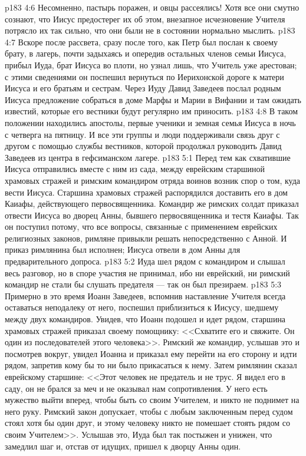 \vs p183 4:6 Несомненно, пастырь поражен, и овцы рассеялись! Хотя все они смутно сознают, что Иисус предостерег их об этом, внезапное исчезновение Учителя потрясло их так сильно, что они были не в состоянии нормально мыслить.
\vs p183 4:7 Вскоре после рассвета, сразу после того, как Петр был послан к своему брату, в лагерь, почти задыхаясь и опередив остальных членов семьи Иисуса, прибыл Иуда, брат Иисуса во плоти, но узнал лишь, что Учитель уже арестован; с этими сведениями он поспешил вернуться по Иерихонской дороге к матери Иисуса и его братьям и сестрам. Через Иуду Давид Заведеев послал родным Иисуса предложение собраться в доме Марфы и Марии в Вифании и там ожидать известий, которые его вестники будут регулярно им приносить.
\vs p183 4:8 В таком положении находились апостолы, первые ученики и земная семья Иисуса в ночь с четверга на пятницу. И все эти группы и люди поддерживали связь друг с другом с помощью службы вестников, которой продолжал руководить Давид Заведеев из центра в гефсиманском лагере.
\vs p183 5:1 Перед тем как схватившие Иисуса отправились вместе с ним из сада, между еврейским старшиной храмовых стражей и римским командиром отряда воинов возник спор о том, куда вести Иисуса. Старшина храмовых стражей распорядился доставить его в дом Каиафы, действующего первосвященника. Командир же римских солдат приказал отвести Иисуса во дворец Анны, бывшего первосвященника и тестя Каиафы. Так он поступил потому, что все вопросы, связанные с применением еврейских религиозных законов, римляне привыкли решать непосредственно с Анной. И приказ римлянина был исполнен; Иисуса отвели в дом Анны для предварительного допроса.
\vs p183 5:2 Иуда шел рядом с командиром и слышал весь разговор, но в споре участия не принимал, ибо ни еврейский, ни римский командир не стали бы слушать предателя --- так он был презираем.
\vs p183 5:3 Примерно в это время Иоанн Заведеев, вспомнив наставление Учителя всегда оставаться неподалеку от него, поспешил приблизиться к Иисусу, шедшему между двух командиров. Увидев, что Иоанн подошел и идет рядом, старшина храмовых стражей приказал своему помощнику: <<Схватите его и свяжите. Он один из последователей этого человека>>. Римский же командир, услышав это и посмотрев вокруг, увидел Иоанна и приказал ему перейти на его сторону и идти рядом, запретив кому бы то ни было прикасаться к нему. Затем римлянин сказал еврейскому старшине: <<Этот человек не предатель и не трус. Я видел его в саду, он не брался за меч и не оказывал нам сопротивления. У него есть мужество выйти вперед, чтобы быть со своим Учителем, и никто не поднимет на него руку. Римский закон допускает, чтобы с любым заключенным перед судом стоял хотя бы один друг, и этому человеку никто не помешает стоять рядом со своим Учителем>>. Услышав это, Иуда был так постыжен и унижен, что замедлил шаг и, отстав от идущих, пришел к дворцу Анны один.
